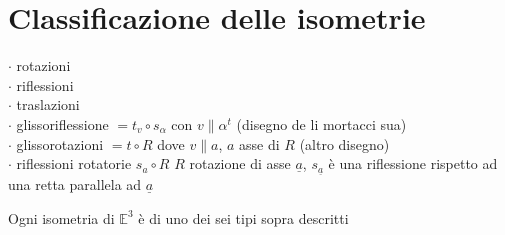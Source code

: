 \documentclass[12px]{article}
\begin{document}
	\section{Classificazione delle isometrie}
	\begin{nome}
	$\cdot$ rotazioni\\
	$\cdot$ riflessioni\\
	$\cdot$ traslazioni\\
	$\cdot$ glissoriflessione $ = t_v\circ s_\alpha$ con $v\parallel \alpha^t$ (disegno de li mortacci sua)\\
$\cdot$ glissorotazioni $= t\circ R$ dove $v \parallel a$, $a$ asse di $R$ (altro disegno)\\
$\cdot$ riflessioni rotatorie $s_a\circ R$  $R$ rotazione di asse $\underline{a}$,  $s_\underline{a}$ è una riflessione rispetto ad una retta parallela ad $\underline{a}$
\end{nome}
\begin{teo}[Eulero 1776]
	Ogni isometria di $\mathbb{E}^3$ è di uno dei sei tipi sopra descritti
\end{teo}
\newpage
\end{document}
